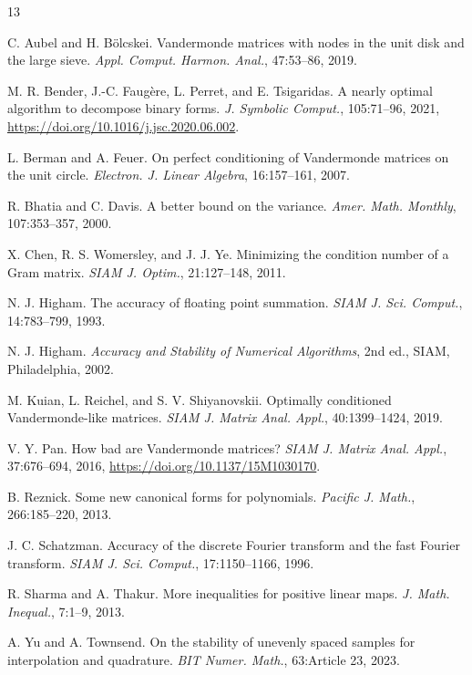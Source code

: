 \documentclass[10pt,twoside,final]{siamart1116}
\numberwithin{equation}{section}
\numberwithin{theorem}{section}
\begin{document}
\begin{thebibliography}{13}

C. Aubel and H. B\"olcskei.
Vandermonde matrices with nodes in the
unit disk and the large sieve.
\emph{Appl. Comput. Harmon. Anal.}, 47:53--86, 2019.

M. R. Bender, J.-C. Faug\`ere, L. Perret, and E. Tsigaridas.
A nearly optimal algorithm to decompose binary forms.
\emph{J. Symbolic Comput.}, 105:71--96, 2021, \url{https://doi.org/10.1016/j.jsc.2020.06.002}.

L. Berman and A. Feuer.
On perfect conditioning of Vandermonde
matrices on the unit circle.
\emph{Electron. J. Linear Algebra}, 16:157--161, 2007.

R. Bhatia and C. Davis.
A better bound on the variance.
\emph{Amer. Math. Monthly}, 107:353--357, 2000.

X. Chen, R. S. Womersley, and J. J. Ye.
Minimizing the condition
number of a Gram matrix.
\emph{SIAM J. Optim.}, 21:127--148, 2011.

N. J. Higham.
The accuracy of floating point summation.
\emph{SIAM J. Sci. Comput.}, 14:783--799, 1993.

N. J. Higham.
\emph{Accuracy and Stability of Numerical Algorithms},
2nd ed., SIAM, Philadelphia, 2002.

M. Kuian, L. Reichel, and S. V. Shiyanovskii.
Optimally conditioned
Vandermonde-like matrices.
\emph{SIAM J. Matrix Anal. Appl.}, 40:1399--1424, 2019.

V. Y. Pan.
How bad are Vandermonde matrices?
\emph{SIAM J. Matrix
Anal. Appl.}, 37:676--694, 2016, \url{https://doi.org/10.1137/15M1030170}.

B. Reznick.
Some new canonical forms for polynomials.
\emph{Pacific J. Math.}, 266:185--220, 2013.

J. C. Schatzman.
Accuracy of the discrete Fourier transform and the
fast Fourier transform.
\emph{SIAM J. Sci. Comput.}, 17:1150--1166, 1996.

R. Sharma and A. Thakur.
More inequalities for positive linear maps.
\emph{J. Math. Inequal.}, 7:1--9, 2013.

A. Yu and A. Townsend.
On the stability of unevenly spaced samples
for interpolation and quadrature. \emph{BIT Numer. Math.}, 63:Article 23, 2023.

\end{thebibliography}
\end{document}
